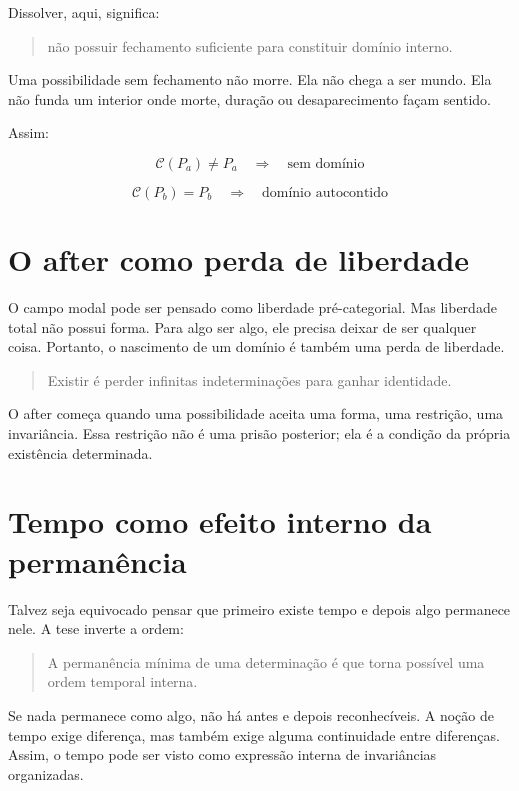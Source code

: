 \documentclass[11pt,a4paper]{article}
\newcommand{\Closure}{\mathcal{C}}
\begin{document}
Dissolver, aqui, significa:

\begin{quote}
não possuir fechamento suficiente para constituir domínio interno.
\end{quote}

Uma possibilidade sem fechamento não morre. Ela não chega a ser mundo. Ela não funda um interior onde morte, duração ou desaparecimento façam sentido.

Assim:

\[
\Closure(P_a) \neq P_a \quad \Rightarrow \quad \text{sem domínio}
\]

\[
\Closure(P_b) = P_b \quad \Rightarrow \quad \text{domínio autocontido}
\]

\section{O after como perda de liberdade}

O campo modal pode ser pensado como liberdade pré-categorial. Mas liberdade total não possui forma. Para algo ser algo, ele precisa deixar de ser qualquer coisa. Portanto, o nascimento de um domínio é também uma perda de liberdade.

\begin{quote}
Existir é perder infinitas indeterminações para ganhar identidade.
\end{quote}

O after começa quando uma possibilidade aceita uma forma, uma restrição, uma invariância. Essa restrição não é uma prisão posterior; ela é a condição da própria existência determinada.

\section{Tempo como efeito interno da permanência}

Talvez seja equivocado pensar que primeiro existe tempo e depois algo permanece nele. A tese inverte a ordem:

\begin{quote}
A permanência mínima de uma determinação é que torna possível uma ordem temporal interna.
\end{quote}

Se nada permanece como algo, não há antes e depois reconhecíveis. A noção de tempo exige diferença, mas também exige alguma continuidade entre diferenças. Assim, o tempo pode ser visto como expressão interna de invariâncias organizadas.
\end{document}
